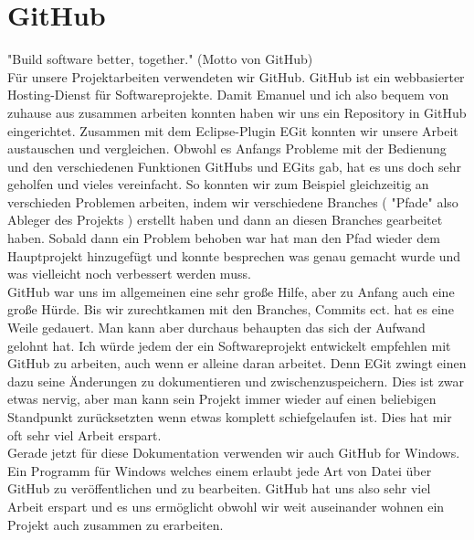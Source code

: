 \section{GitHub}

"Build software better, together." (Motto von GitHub)\\

Für unsere Projektarbeiten verwendeten wir GitHub. GitHub ist ein webbasierter Hosting-Dienst für Softwareprojekte. Damit Emanuel und ich also bequem von zuhause aus zusammen arbeiten konnten haben wir uns ein Repository in GitHub eingerichtet. Zusammen mit dem Eclipse-Plugin EGit konnten wir unsere Arbeit austauschen und vergleichen. Obwohl es Anfangs Probleme mit der Bedienung und den verschiedenen Funktionen GitHubs und EGits gab, hat es uns doch sehr geholfen und vieles vereinfacht. So konnten wir zum Beispiel gleichzeitig an verschieden Problemen arbeiten, indem wir verschiedene Branches ( "Pfade" also Ableger des Projekts ) erstellt haben und dann an diesen Branches gearbeitet haben. Sobald dann ein Problem behoben war hat man den Pfad wieder dem Hauptprojekt hinzugefügt und konnte besprechen was genau gemacht wurde und was vielleicht noch verbessert werden muss.\\

GitHub war uns im allgemeinen eine sehr große Hilfe, aber zu Anfang auch eine große Hürde. Bis wir zurechtkamen mit den Branches, Commits ect. hat es eine Weile gedauert. Man kann aber durchaus behaupten das sich der Aufwand gelohnt hat. Ich würde jedem der ein Softwareprojekt entwickelt empfehlen mit GitHub zu arbeiten, auch wenn er alleine daran arbeitet. Denn EGit zwingt einen dazu seine Änderungen zu dokumentieren und zwischenzuspeichern. Dies ist zwar etwas nervig, aber man kann sein Projekt immer wieder auf einen beliebigen Standpunkt zurücksetzten wenn etwas komplett schiefgelaufen ist. Dies hat mir oft sehr viel Arbeit erspart.\\

Gerade jetzt für diese Dokumentation verwenden wir auch GitHub for Windows. Ein Programm für Windows welches einem erlaubt jede Art von Datei über GitHub zu veröffentlichen und zu bearbeiten. GitHub hat uns also sehr viel Arbeit erspart und es uns ermöglicht obwohl wir weit auseinander wohnen ein Projekt auch zusammen zu erarbeiten.\\
